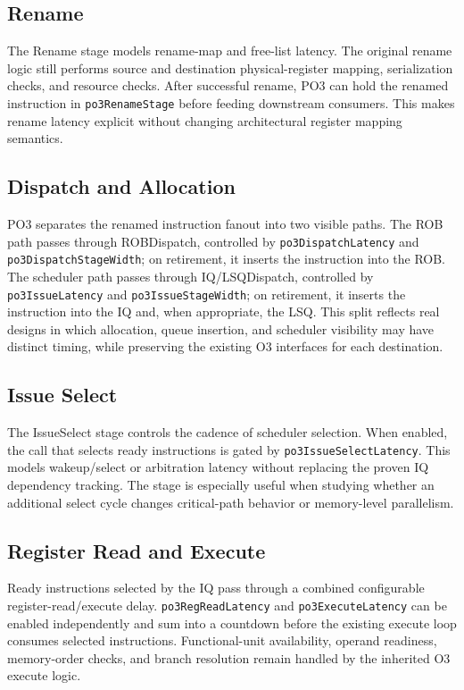 \documentclass[10pt,twocolumn]{article}
\newcommand{\po}{\textsc{PO3}}
\newcommand{\oo}{\textsc{O3}}
\newcommand{\stage}[1]{\textsf{#1}}
\begin{document}
\subsection{Rename}
The \stage{Rename} stage models rename-map and free-list latency.  The original rename logic still performs source and destination physical-register mapping, serialization checks, and resource checks.  After successful rename, \po{} can hold the renamed instruction in \texttt{po3RenameStage} before feeding downstream consumers.  This makes rename latency explicit without changing architectural register mapping semantics.

\subsection{Dispatch and Allocation}
\po{} separates the renamed instruction fanout into two visible paths.  The ROB path passes through \stage{ROBDispatch}, controlled by \texttt{po3DispatchLatency} and \texttt{po3DispatchStageWidth}; on retirement, it inserts the instruction into the ROB.  The scheduler path passes through \stage{IQ/LSQDispatch}, controlled by \texttt{po3IssueLatency} and \texttt{po3IssueStageWidth}; on retirement, it inserts the instruction into the IQ and, when appropriate, the LSQ.  This split reflects real designs in which allocation, queue insertion, and scheduler visibility may have distinct timing, while preserving the existing \oo{} interfaces for each destination.

\subsection{Issue Select}
The \stage{IssueSelect} stage controls the cadence of scheduler selection.  When enabled, the call that selects ready instructions is gated by \texttt{po3IssueSelectLatency}.  This models wakeup/select or arbitration latency without replacing the proven IQ dependency tracking.  The stage is especially useful when studying whether an additional select cycle changes critical-path behavior or memory-level parallelism.

\subsection{Register Read and Execute}
Ready instructions selected by the IQ pass through a combined configurable register-read/execute delay.  \texttt{po3RegReadLatency} and \texttt{po3ExecuteLatency} can be enabled independently and sum into a countdown before the existing execute loop consumes selected instructions.  Functional-unit availability, operand readiness, memory-order checks, and branch resolution remain handled by the inherited \oo{} execute logic.
\end{document}

